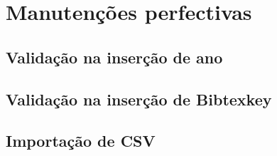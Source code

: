 \section{Manutenções perfectivas}
    \subsection{Validação na inserção de ano}
    \subsection{Validação na inserção de Bibtexkey}
    \subsection{Importação de CSV}
